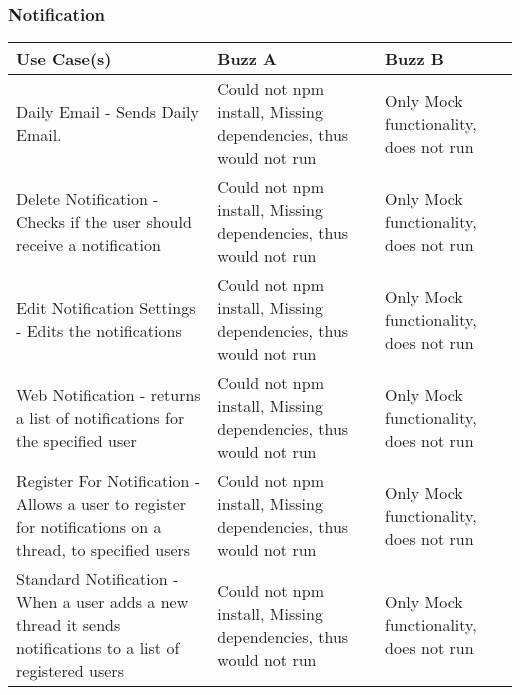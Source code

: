 \documentclass[12pt]{article}
\begin{document}
\subsubsection{Notification}%
\begin{tabular}{|p{4.5cm}|p{4.5cm}|p{4.5cm}|}

\hline
Use Case(s) & Buzz A & Buzz B \\ 
\hline
Daily Email - Sends Daily Email. & Could not npm install, Missing dependencies, thus would not run & Only Mock functionality, does not run \\ %
\hline
Delete Notification - Checks if the user should receive a notification & Could not npm install, Missing dependencies, thus would not run & Only Mock functionality, does not run\\ %
\hline
Edit Notification Settings - Edits the notifications  & Could not npm install, Missing dependencies, thus would not run & Only Mock functionality, does not run\\ %
\hline
Web Notification - returns a list of notifications for the specified user & Could not npm install, Missing dependencies, thus would not run & Only Mock functionality, does not run \\ %
\hline
Register For Notification - Allows a user to register for notifications on a thread, to specified users  & Could not npm install, Missing dependencies, thus would not run & Only Mock functionality, does not run \\ %
\hline
Standard Notification - When a user adds a new thread it sends notifications to a list of registered users & Could not npm install, Missing dependencies, thus would not run &  Only Mock functionality, does not run\\ %
\hline


\end{tabular}
\end{document}
